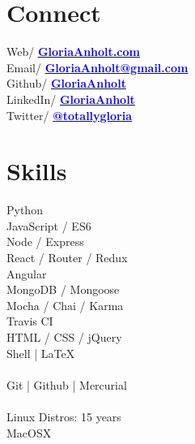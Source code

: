 \documentclass[]{deedy-resume-openfont}
\begin{document}
\hfill
\begin{minipage}[t]{0.26\textwidth}


\vspace{3mm}
\section{Connect}
Web/ \href{http://www.GloriaAnholt.com}{\textbf{\textcolor{blue}{GloriaAnholt.com}}} \\
Email/ \href{mailto:gloriaanholt@gmail.com}{\textbf{\textcolor{blue}{GloriaAnholt@gmail.com}}} \\
Github/ \href{https://github.com/GloriaAnholt}{\textbf{\textcolor{blue}{GloriaAnholt}}} \\
LinkedIn/ \href{https://www.linkedin.com/in/gloriaanholt}{\textbf{\textcolor{blue}{GloriaAnholt}}} \\
Twitter/ \href{https://twitter.com/totallygloria}{\textbf{\textcolor{blue}{@totallygloria}}}
\sectionsep


\section{Skills}
\location{}
Python  \\
JavaScript / ES6 \\
Node / Express \\
React / Router / Redux \\
Angular \\
MongoDB / Mongoose \\
Mocha / Chai / Karma \\
Travis CI \\
HTML / CSS / jQuery \\
Shell  |  LaTeX \\
\vspace{\topsep} %
 \\
\location{}
Git | Github | Mercurial \\
\vspace{\topsep} %
 \\
\location{}
Linux Distros: 15 years \\
MacOSX \\
\sectionsep


\end{minipage}
\end{document}
